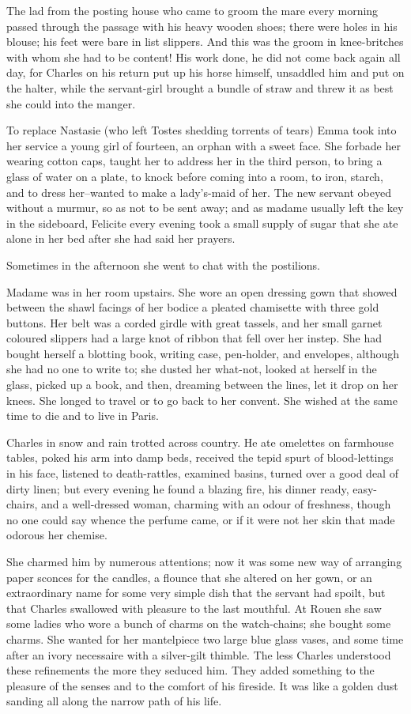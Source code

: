 \documentclass{tufte-book}
\begin{document}
The lad from the posting house who came to groom the mare every morning
passed through the passage with his heavy wooden shoes; there were holes
in his blouse; his feet were bare in list slippers. And this was the
groom in knee-britches with whom she had to be content! His work done,
he did not come back again all day, for Charles on his return put up
his horse himself, unsaddled him and put on the halter, while the
servant-girl brought a bundle of straw and threw it as best she could
into the manger.

To replace Nastasie (who left Tostes shedding torrents of tears) Emma
took into her service a young girl of fourteen, an orphan with a sweet
face. She forbade her wearing cotton caps, taught her to address her in
the third person, to bring a glass of water on a plate, to knock before
coming into a room, to iron, starch, and to dress her--wanted to make a
lady's-maid of her. The new servant obeyed without a murmur, so as not
to be sent away; and as madame usually left the key in the sideboard,
Felicite every evening took a small supply of sugar that she ate alone
in her bed after she had said her prayers.

Sometimes in the afternoon she went to chat with the postilions.

Madame was in her room upstairs. She wore an open dressing gown that
showed between the shawl facings of her bodice a pleated chamisette with
three gold buttons. Her belt was a corded girdle with great tassels, and
her small garnet coloured slippers had a large knot of ribbon that fell
over her instep. She had bought herself a blotting book, writing case,
pen-holder, and envelopes, although she had no one to write to; she
dusted her what-not, looked at herself in the glass, picked up a book,
and then, dreaming between the lines, let it drop on her knees. She
longed to travel or to go back to her convent. She wished at the same
time to die and to live in Paris.

Charles in snow and rain trotted across country. He ate omelettes on
farmhouse tables, poked his arm into damp beds, received the tepid
spurt of blood-lettings in his face, listened to death-rattles, examined
basins, turned over a good deal of dirty linen; but every evening he
found a blazing fire, his dinner ready, easy-chairs, and a well-dressed
woman, charming with an odour of freshness, though no one could say
whence the perfume came, or if it were not her skin that made odorous
her chemise.

She charmed him by numerous attentions; now it was some new way of
arranging paper sconces for the candles, a flounce that she altered on
her gown, or an extraordinary name for some very simple dish that the
servant had spoilt, but that Charles swallowed with pleasure to the last
mouthful. At Rouen she saw some ladies who wore a bunch of charms on the
watch-chains; she bought some charms. She wanted for her mantelpiece two
large blue glass vases, and some time after an ivory necessaire with a
silver-gilt thimble. The less Charles understood these refinements
the more they seduced him. They added something to the pleasure of the
senses and to the comfort of his fireside. It was like a golden dust
sanding all along the narrow path of his life.
\end{document}
